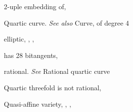 {{\noindent\hspace*{7.5bp}2-uple embedding of, \par
\noindent\hspace*{0.0bp}Quartic curve. \emph{See also} Curve, of degree 4\par
\noindent\hspace*{7.5bp}elliptic, , , \par
\noindent\hspace*{7.5bp}has 28 bitangents, \par
\noindent\hspace*{7.5bp}rational. \emph{See} Rational quartic curve\par
\noindent\hspace*{0.0bp}Quartic threefold is not rational, \par
\noindent\hspace*{0.0bp}Quasi-affine variety, , , \par
}
}
